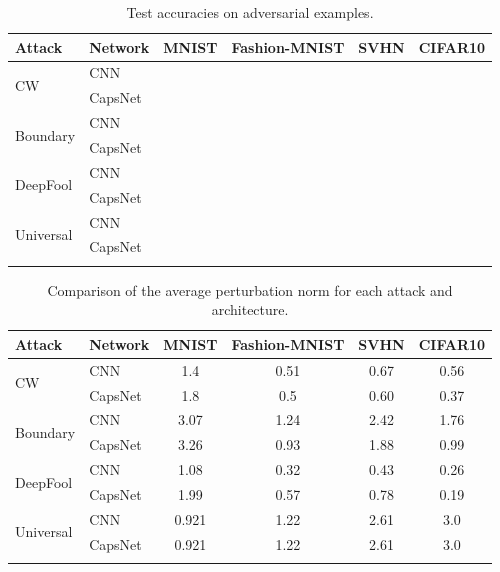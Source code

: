 \documentclass{article}
\begin{document}
\begin{table}[h]
	\centering
	\begin{tabular}{llcccc}
		\toprule
		Attack & Network       & MNIST & Fashion-MNIST & SVHN & CIFAR10  \\
		\midrule
		\multirow{2}{*}{CW} & CNN &  &  &  &  \\
		& CapsNet            &  &  &  &  \\
		\midrule
		\multirow{2}{*}{Boundary} & CNN &  &  &  &  \\
		& CapsNet            &  &  &  &  \\
		\midrule
		\multirow{2}{*}{DeepFool} & CNN &  &  &  &  \\
		& CapsNet           &  &  &  &  \\
		\midrule
		\multirow{2}{*}{Universal} & CNN &  &  &  &  \\
		& CapsNet           &  &  &  &  \\
		\bottomrule\\
	\end{tabular}
	\label{tab:attacks}
	\caption{Test accuracies on adversarial examples.}
\end{table}

\begin{table}[h]
	\centering
	\begin{tabular}{llcccc}
		\toprule
		Attack & Network       & MNIST & Fashion-MNIST & SVHN & CIFAR10  \\
		\midrule
		\multirow{2}{*}{CW} & CNN & 1.4 & 0.51 & 0.67 & 0.56 \\
		& CapsNet            & 1.8 & 0.5 & 0.60 & 0.37 \\
		\midrule
		\multirow{2}{*}{Boundary} & CNN & 3.07 & 1.24 & 2.42 & 1.76 \\
		& CapsNet            & 3.26 & 0.93 & 1.88 & 0.99 \\
		\midrule
		\multirow{2}{*}{DeepFool} & CNN & 1.08 & 0.32 & 0.43 & 0.26 \\
		& CapsNet           & 1.99 & 0.57 & 0.78 & 0.19 \\
		\midrule
		\multirow{2}{*}{Universal} & CNN & 0.921 & 1.22 & 2.61 & 3.0 \\
		& CapsNet           & 0.921 & 1.22 & 2.61 & 3.0 \\
		\bottomrule\\
	\end{tabular}
	\label{tab:norms}
	\caption{Comparison of the average perturbation norm for each attack and architecture.}
\end{table}
\end{document}
